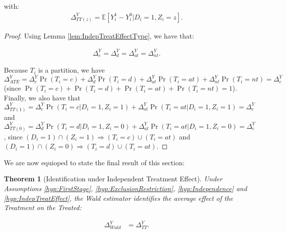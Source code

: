 \documentclass[
]{book}
\newcommand{\esp}[1]{\mathbb{E}[ #1 ]}
\newtheorem{theorem}{Theorem}[chapter]
\theoremstyle{definition}
\theoremstyle{definition}
\theoremstyle{definition}
\theoremstyle{definition}
\theoremstyle{remark}
\begin{document}
with:
\begin{align*}
\Delta^Y_{TT(z)} = \esp{Y_i^1-Y_i^0|D_i=1,Z_i=z}.
\end{align*}

\begin{proof}
\iffalse{} {Proof. } \fi{}Using Lemma \ref{lem:IndepTreatEffectType}, we have that:

\begin{align*}
  \Delta^Y_{c} = \Delta^Y_{d} = \Delta^Y_{at} =\Delta^Y_{nt}.
\end{align*}

Because \(T_i\) is a partition, we have \(\Delta^Y_{ATE}=\Delta^Y_{c}\Pr(T_i=c)+\Delta^Y_{d}\Pr(T_i=d)+\Delta^Y_{at}\Pr(T_i=at)+\Delta^Y_{nt}\Pr(T_i=nt)=\Delta^Y_{c}\) (since \(\Pr(T_i=c)+\Pr(T_i=d)+\Pr(T_i=at)+\Pr(T_i=nt)=1\)).
Finally, we also have that \(\Delta^Y_{TT(1)}=\Delta^Y_{c}\Pr(T_i=c|D_i=1,Z_i=1)+\Delta^Y_{at}\Pr(T_i=at|D_i=1,Z_i=1)=\Delta^Y_{c}\) and \(\Delta^Y_{TT(0)}=\Delta^Y_{d}\Pr(T_i=d|D_i=1,Z_i=0)+\Delta^Y_{at}\Pr(T_i=at|D_i=1,Z_i=0)=\Delta^Y_{c}\), since \((D_i=1)\cap(Z_i=1)\Rightarrow (T_i=c)\cup(T_i=at)\) and \((D_i=1)\cap(Z_i=0)\Rightarrow (T_i=d)\cup(T_i=at)\).
\end{proof}

We are now equioped to state the final result of this section:

\begin{theorem}[Identification under Independent Treatment Effect]
\protect\hypertarget{thm:IdentIndepTreatEffect}{}{\label{thm:IdentIndepTreatEffect} \iffalse (Identification under Independent Treatment Effect) \fi{} }Under Assumptions \ref{hyp:FirstStage}, \ref{hyp:ExclusionRestriction}, \ref{hyp:Independence} and \ref{hyp:IndepTreatEffect}, the Wald estimator identifies the average effect of the Treatment on the Treated:

\begin{align*}
  \Delta^Y_{Wald} & = \Delta^Y_{TT}.
\end{align*}
\end{theorem}
\end{document}
